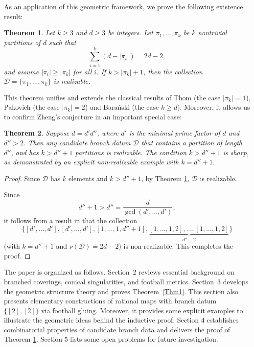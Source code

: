 \documentclass[microtype]{gtpart}     %
\newtheorem{theorem}{Theorem}[section]    %
\theoremstyle{definition}
\begin{document}
As an application of this geometric framework, we prove the following existence result:

\begin{theorem}\label{Thm2}
Let $k \geq 3$ and $d \geq 3$ be integers. Let $\pi_1, \ldots, \pi_k$ be $k$ nontrivial partitions of $d$ such that
\[
\sum_{i=1}^k (d - |\pi_i|) = 2d - 2,
\]
and assume $|\pi_i| \geq |\pi_k|$ for all $i$. If $k > |\pi_k| + 1$, then the collection $\mathcal{D} = \{\pi_1, \ldots, \pi_k\}$ is realizable.
\end{theorem}

This theorem unifies and extends the classical results of Thom (the case $|\pi_k| = 1$), Pakovich (the case $|\pi_k| = 2$)  and Bara\'{n}ski (the case $k\geq d$). Moreover, it allows us to confirm Zheng's conjecture in an important special case:

\begin{theorem}\label{Thm3}
Suppose $d = d' d''$, where $d'$ is the minimal prime factor of $d$ and $d'' > 2$. Then any candidate branch datum $\mathcal{D}$ that contains a partition of length $d''$, and has $k > d'' + 1$ partitions is realizable. The condition $k > d'' + 1$ is sharp, as demonstrated by an explicit non-realizable example with $k = d'' + 1$.
\end{theorem}

\begin{proof}
Since $\mathcal{D}$ has $k$ elements and $k > d'' + 1$, by Theorem \ref{Thm2}, $\mathcal{D}$ is realizable.

Since
\[
d'' + 1 > d'' = \frac{d}{\gcd(d', \ldots, d')},
\]
it follows from a result in \cite{SX20}  that the collection
\[
\{[d', \ldots, d'], [d', \ldots, d'], [1, \ldots, 1, d'' + 1], \underbrace{[1, \ldots, 1, 2], \ldots, [1, \ldots, 1, 2]}_{d''-2}\}
\]
(with $k = d'' + 1$ and $\nu(\mathcal{D}) = 2d - 2$) is non-realizable. This completes the proof.
\end{proof}




The paper is organized as follows. Section~2 reviews essential background on branched coverings, conical singularities, and football metrics. Section~3 develops the geometric structure theory and proves Theorem~\ref{Thm1}. This section also presents elementary constructions of rational maps with branch datum $\{[2],[2]\}$ via football gluing. Moreover, it provides some explicit examples to illustrate the geometric ideas behind the inductive proof. Section 4 establishes combinatorial properties of candidate branch data and delivers the
proof of Theorem \ref{Thm2}. Section 5 lists some open problems for future investigation.
\end{document}
